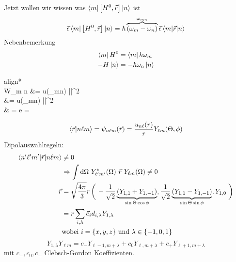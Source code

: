 	Jetzt wollen wir wissen was $\braket{m | \left[H^0 , \vec{r}\right] | n}$ ist
		\begin{align*}
			\vec{\epsilon} \braket{m | \left[H^0 , \vec{r}\right] | n} 
			= \hbar \overbrace{(\omega_m - \omega_n)}^{\mathclap{\omega_{mn}}} \vec{\epsilon} \braket{m | \vec{r} | n}
		\end{align*}
	Nebenbemerkung 
		\begin{align*}
			\bra{m} H^0 &= \bra{m} \hbar \omega_m \\
			-H \ket{n} &= -\hbar \omega_n \ket{n}
		\end{align*}
		\begin{empheq}[box=\boxed]{align*}
			 \\
					W_{m \rightarrow n} &=  u(\omega_{mn}) 
					\left|\right|^2\\
					&=  u(\omega_{mn}) 
					\left|\right|^2\\
					&  = e  =  \cdot {}
		\end{empheq}
		\begin{equation*}
			\braket{\vec{r} | n \ell m} = \psi_{n \ell m} (\vec{r}) 
			= \frac{u_{n \ell}(r)}{r} Y_{\ell m} (\Theta, \phi)
		\end{equation*}
	\underline{Dipolauswahlregeln:}
		\begin{align*}
			\braket{n' \ell' m' | \vec{r} | n \ell m} &\neq 0 \\
			&\Rightarrow \int \diff \Omega~Y^*_{\ell' m'}(\Omega)~\vec{r}~Y_{\ell m} (\Omega) \neq 0 \\
			\vec{r} &= \sqrt{\frac{4 \pi}{3}} r 
			\left( \vphantom{-\frac{1}{\sqrt{2}}} \right. -\frac{1}{\sqrt{2}} 
				\underbrace{(Y_{1,1} + Y_{1,-1})}_{\mathclap{\sin \Theta \cos \phi}},
				\frac{1}{\sqrt{2}} \underbrace{(Y_{1,1} - Y_{1,-1})}_{\mathclap{\sin \Theta \sin \phi}},
				Y_{1,0}
			\left. \vphantom{-\frac{1}{\sqrt{2}}} \right) \\
			&= r \sum_{i,\lambda} \vec{e}_i d_{i,\lambda} Y_{1,\lambda} \\
			&\text{wobei~} i = \{x,y,z\} \text{~und~} \lambda \in \{-1,0,1\} 
		\end{align*}
		\begin{equation*}
			Y_{1,\lambda} Y_{\ell m} = c_- Y_{\ell - 1, m + \lambda}
			+ c_0 Y_{\ell, m+\lambda} + c_+ Y_{\ell + 1, m + \lambda}
		\end{equation*}
	mit $c_-,c_0, c_+$ Clebsch-Gordon Koeffizienten.
	
